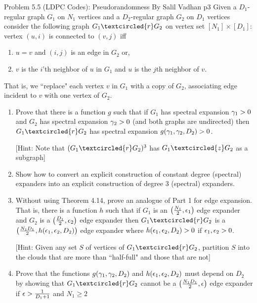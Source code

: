 \documentclass[a4paper, 11pt]{article}
\begin{document}
\begin{problem}{%
		Problem 5.5 (LDPC Codes): Pseudorandomness By Salil Vadhan
	}{p3%
	}
	Given a $D_1$-regular graph $G_1$ on $N_1$ vertices and a $D_2$-regular graph $G_2$ on $D_1$ vertices consider the following graph $G_1\textcircled{r}G_2$ on vertex set $[N_1]\times [D_1]$: vertex $(u,i)$ is connected to $(v,j)$ iff \begin{enumerate}[label=(\alph*)]
		\item $u=v$ and $(i,j)$ is an edge in $G_2$ or,
		\item $v$ is the $i$'th neighbor of $u$ in $G_1$ and $u$ is the $j$th neighbor of $v$. 
	\end{enumerate}
	That is, we ``replace" each vertex $v$ in $G_1$ with a copy of $G_2$, associating edge incident to $v$ with one vertex of $G_2$.
	\begin{enumerate}
		\item Prove that there is a function $g$ such that if $G_1$ has spectral expansion $\gamma_1>0$ and $G_2$ has spectral expansion $\gamma_2>0$ (and both graphs are undirected) then $G_1\textcircled{r}G_2$ has spectral expansion $g(\gamma_1,\gamma_2,D_2)>0$.
		
		[Hint: Note that $(G_1\textcircled{r}G_2)^3$ has $G_1\textcircled{z}G_2$ as a subgraph]
		\item Show how to convert an explicit construction of constant degree (spectral) expanders into an explicit construction of degree 3 (spectral) expanders.
		\item Without using Theorem 4.14, prove an analogue of Part 1 for edge expansion. That is, there is a function $h$ such that if $G_1$ is an $\left(\frac{N_1}2,\epsilon_1\right)$ edge expander and $G_2$ is a $\left(\frac{D_1}2,\epsilon_2\right)$ edge expander then $G_1\textcircled{r}G_2$ is a $\left(\frac{N_1D_1}{2},h(\epsilon_1,\epsilon_2,D_2)\right)$ edge expander where $h(\epsilon_1,\epsilon_2,D_2)>0$ if $\epsilon_1,\epsilon_2>0$. 
		
		[Hint: Given any set $S$ of vertices of $G_1\textcircled{r}G_2$, partition $S$ into the clouds that are more than ``half-full" and those that are not]
		\item Prove that the functions $g(\gamma_1,\gamma_2,D_2)$ and $h(\epsilon_1,\epsilon_2,D_2)$ must depend on $D_2$ by showing that $G_1\textcircled{r}G_2$ cannot be a $\left(\frac{N_1D_1}2,\epsilon\right)$ edge expander if $\epsilon>\frac1{D_1+1}$ and $N_1\geq 2$
	\end{enumerate}
\end{problem}
\end{document}

